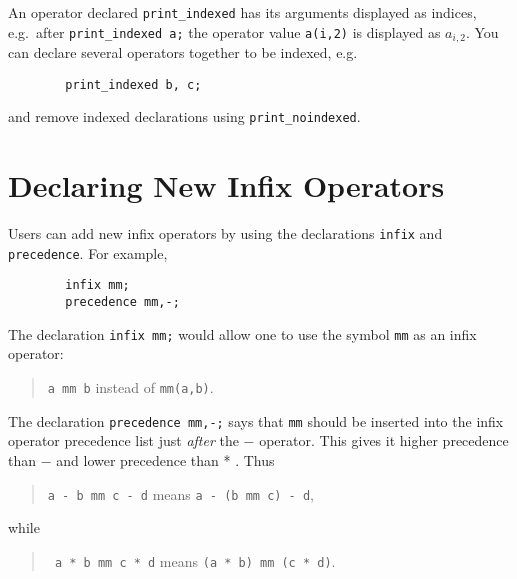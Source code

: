 \hypertarget{command:PRINT_INDEXED}{}\hypertarget{command:PRINT_NOINDEXED}{}

An operator declared
\texttt{print\_indexed} has
its arguments displayed as indices, e.g.\ after
\texttt{print\_indexed~a;} the operator value \texttt{a(i,2)} is
displayed as \(a_{i,2}\).  You can declare several operators together
to be indexed, e.g.
\begin{verbatim}
        print_indexed b, c;
\end{verbatim}
and remove indexed declarations using
\texttt{print\_noindexed}.


\section{Declaring New Infix Operators}
\hypertarget{command:INFIX}{}
\hypertarget{command:PRECEDENCE}{}

Users can add new infix operators by using the declarations
\texttt{infix} and
\texttt{precedence}.
For example,
\begin{verbatim}
        infix mm;
        precedence mm,-;
\end{verbatim}
The declaration \texttt{infix mm;} would allow one to use the symbol
\texttt{mm} as an infix operator:
\begin{quote}
\hspace{0.2in} \texttt{a mm b} \hspace{0.3in} instead of \hspace{0.3in}
\texttt{mm(a,b)}.
\end{quote}

The declaration \texttt{precedence mm,-;} says that \texttt{mm} should be
inserted into the infix operator precedence list just {\em after\/}
the $-$ operator.  This gives it higher precedence than $-$ and lower
precedence than * .  Thus

\begin{quote}
\hspace{0.2in}\texttt{a - b mm c - d}\hspace{.3in} means \hspace{.3in}
\texttt{a - (b mm c) - d},
\end{quote}
while
\begin{quote}
\hspace{0.2in}\texttt{  a * b mm c * d}\hspace{.3in} means \hspace{.3in}
\texttt{(a * b) mm (c * d)}.
\end{quote}

